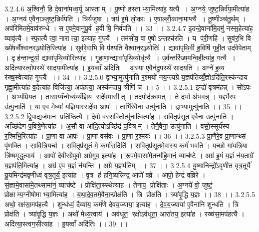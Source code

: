 3.2.4.6
अ॒श्विनौ॒ हि दे॒वाना॑मध्व॒र्यू आस्ताम् । पू॒ष्णो हस्ताभ्या॒मित्या॑ह॒ यत्यै । अ॒ग्नये॒ जुष्ट॒न्निर्व॑पा॒मीत्या॑ह । अ॒ग्नय॑ ए॒वैना॒ञ्जुष्ट॒न्निर्व॑पति । त्रिर्यजु॑षा । त्रय॑ इ॒मे लो॒काः । ए॒षाल्लोँ॒काना॒माप्त्यै । तू॒ष्णीञ्च॑तु॒र्थम् । अप॑रिमितमे॒वाव॑रुन्धे । स ए॒वमे॒वानु॑पू॒र्व ह॒वीषि॒ निर्व॑पति ।। 33 ।।
3.2.4.7
इ॒दन्दे॒वाना॑मि॒दमु॑ नस्स॒हेत्या॑ह॒ व्यावृ॑त्यै । स्फा॒त्यै त्वा॒ नारात्या॒ इत्या॑ह॒ गुप्त्यै । तम॑सीव॒ वा ए॒षोऽन्तश्च॑रति । य प॑री॒णहि॑ । सुव॑र॒भि वि ख्ये॑षव्वैँश्वान॒रञ्ज्योति॒रित्या॑ह । सुव॑रे॒वाभि वि प॑श्यति वैश्वान॒रञ्ज्योतिः॑ । द्यावा॑पृथि॒वी ह॒विषि॑ गृही॒त उद॑वेपेताम् । दृह॑न्ता॒न्दुर्या॒ द्यावा॑पृथि॒व्योरित्या॑ह । गृ॒हाणा॒न्द्यावा॑पृथि॒व्योर्धृत्यै । उ॒र्व॑न्तरि॑ख्ष॒मन्वि॒हीत्या॑ह॒ गत्यै । अदि॑त्यास्त्वो॒पस्थे॑ सादया॒मीत्या॑ह । इ॒यव्वाँ अदि॑तिः । अ॒स्या ए॒वैन॑दु॒पस्थे॑ सादयति । अग्ने॑ ह॒व्य र॑ख्ष॒स्वेत्या॑ह॒ गुप्त्यै ।। 34 ।।
3.2.5.0
द्वाभ्या॒मुत्पु॑नाति र॒श्मयो॑ नय॒न्त्यग्रे॑ य॒ज्ञप॑तिय्यँ॒ज्ञोऽदि॑ति॒रस्क॑न्दाय गृह्णा॒मीत्या॑ह व॒देत्या॑ह॒ विजि॑त्या॒ अप॑हत्या॒ अस्क॑न्दाय॒ त्रीणि॑ च ।। 5 ।।
3.2.5.1
इन्द्रो॑ वृ॒त्रम॑हन्न् । सो॑ऽपः । अ॒भ्य॑म्रियत । तासा॒य्यँन्मेध्य॑य्यँ॒ज्ञिय॒॒ सदे॑व॒मासीत् । तदपोद॑क्रामत् । ते द॒र्भा अ॑भवन्न् । यद्द॒र्भैर॒प उ॑त्पु॒नाति॑ । या ए॒व मेध्या॑ य॒ज्ञिया॒स्सदे॑वा॒ आपः॑ । ताभि॑रे॒वैना॒ उत्पु॑नाति । द्वाभ्या॒मुत्पु॑नाति ।। 35 ।।
3.2.5.2
द्वि॒पाद्यज॑मान॒ प्रति॑ष्ठित्यै । दे॒वो व॑स्सवि॒तोत्पु॑ना॒त्वित्या॑ह । स॒वि॒तृप्र॑सूत ए॒वैना॒ उत्पु॑नाति । अच्छि॑द्रेण प॒वित्रे॒णेत्या॑ह । अ॒सौ वा आ॑दि॒त्योऽच्छि॑द्रं प॒वित्रम् । तेनै॒वैना॒ उत्पु॑नाति । वसो॒स्सूर्य॑स्य र॒श्मिभि॒रित्या॑ह । प्रा॒णा वा आपः॑ । प्रा॒णा वस॑वः । प्रा॒णा र॒श्मयः॑ ।। 36 ।।
3.2.5.3
प्रा॒णैरे॒व प्रा॒णान्थ्सं पृ॑णक्ति । सा॒वि॒त्रि॒यर्चा । स॒वि॒तृप्र॑सूतं मे॒ कर्मा॑स॒दिति॑ । स॒वि॒तृप्र॑सूतमे॒वास्य॒ कर्म॑ भवति । प॒च्छो गा॑यत्रि॒या त्रि॑ष्षमृद्ध॒त्वाय॑ । आपो॑ देवीरग्रेपुवो अग्रेगुव॒ इत्या॑ह । रू॒पमे॒वासा॑मे॒तन्म॑हि॒मानं॒ व्याच॑ष्टे । अग्र॑ इ॒मं य॒ज्ञं न॑य॒ताग्रे॑ य॒ज्ञप॑ति॒मित्या॑ह । अग्र॑ ए॒व य॒ज्ञं न॑यन्ति । अग्रे॑ य॒ज्ञप॑तिम् ।। 37 ।।
3.2.5.4
यु॒ष्मानिन्द्रो॑ऽवृणीत वृत्र॒तूर्ये॑ यू॒यमिन्द्र॑मवृणीध्वं वृत्र॒तूर्य॒ इत्या॑ह । वृ॒त्र ह॑ हनि॒ष्यन्निन्द्र॒ आपो॑ वव्रे । आपो॒ हेन्द्रं॑ वव्रिरे । सं॒ज्ञामे॒वासा॑मे॒तथ्सामा॑नं॒ व्याच॑ष्टे । प्रोक्षि॑ता॒स्स्थेत्या॑ह । तेनाप॒ प्रोक्षि॑ताः । अ॒ग्नये॑ वो॒ जुष्टं॒ प्रोक्षाम्य॒ग्नीषोमाभ्या॒मित्या॑ह । य॒था॒दे॒व॒तमे॒वैना॒न्प्रोक्ष॑ति । त्रि प्रोक्ष॑ति । त्र्या॑वृ॒द्धि य॒ज्ञः ।। 38 ।।
3.2.5.5
अथो॒ रक्ष॑सा॒मप॑हत्यै । शुन्ध॑ध्वं॒ दैव्या॑य॒ कर्म॑णे देवय॒ज्याया॒ इत्या॑ह । दे॒व॒य॒ज्याया॑ ए॒वैना॑नि शुन्धति । त्रि प्रोक्ष॑ति । त्र्या॑वृ॒द्धि य॒ज्ञः । अथो॑ मेध्य॒त्वाय॑ । अव॑धूत॒॒ रक्षोऽव॑धूता॒ आरा॑तय॒ इत्या॑ह । रख्ष॑सा॒मप॑हत्यै । अदि॑त्या॒स्त्वग॒सीत्या॑ह । इ॒यव्वाँ अदि॑तिः ।। 39 ।।

